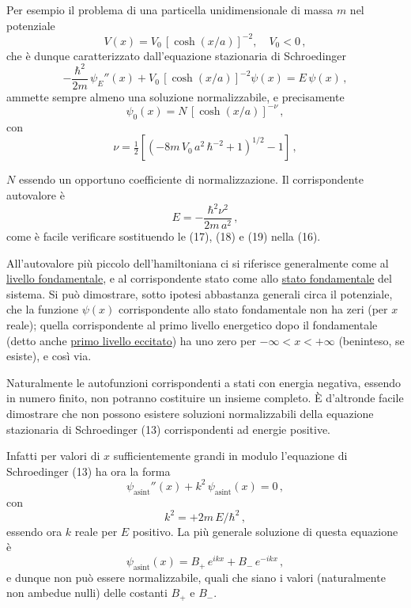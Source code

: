\documentclass[11pt, a4paper]{book}
\numberwithin{equation}{section}
\begin{document}
Per esempio il problema di una particella unidimensionale di massa
$m$ nel potenziale
\begin{equation}
V(x) = V_0\, \left[\cosh(x/a)\right]^{-2}, \quad V_0 < 0 \,, \tag{15}
\end{equation}
che è dunque caratterizzato dall'equazione stazionaria di Schroedinger
\begin{equation}
-\frac{\hbar^2}{2m}\, \psi_E''(x) + V_0\, \left[\cosh(x/a)\right]^{-2} \psi(x) = E\, \psi(x) \,, \tag{16}
\end{equation}
ammette sempre almeno una soluzione normalizzabile, e precisamente
\begin{equation}
\psi_0(x) = N\, \left[\cosh(x/a)\right]^{-\nu} \,, \tag{17}
\end{equation}
con
\begin{equation}
\nu = \tfrac{1}{2}\left[\left(-8m\, V_0\, a^2\, \hbar^{-2} + 1\right)^{1/2} - 1\right] \,, \tag{18}
\end{equation}


$N$ essendo un opportuno coefficiente di normalizzazione. Il corrispondente autovalore è
\begin{equation}
E = -\frac{\hbar^2 \nu^2}{2m\, a^2} \,, \tag{19}
\end{equation}
come è facile verificare sostituendo le (17), (18) e (19) nella (16).

All'autovalore più piccolo dell'hamiltoniana ci si riferisce generalmente come al \underline{livello fondamentale}, e al corrispondente stato come allo \underline{stato fondamentale} del sistema. Si può dimostrare, sotto ipotesi abbastanza generali circa il potenziale, che la funzione $\psi(x)$ corrispondente allo stato fondamentale non ha zeri (per $x$ reale); quella corrispondente al primo livello energetico dopo il fondamentale (detto anche \underline{primo livello eccitato}) ha uno zero per $-\infty < x < +\infty$ (beninteso, se esiste), e così via.

Naturalmente le autofunzioni corrispondenti a stati con energia negativa, essendo in numero finito, non potranno costituire un insieme completo. È d'altronde facile dimostrare che non possono esistere soluzioni normalizzabili della equazione stazionaria di Schroedinger (13) corrispondenti ad energie positive.

Infatti per valori di $x$ sufficientemente grandi in modulo l'equazione di Schroedinger (13) ha ora la forma
\[
\psi_{\text{asint}}''(x) + k^2\, \psi_{\text{asint}}(x) = 0 \,,
\]
con
\[
k^2 = +2m\, E / \hbar^2 \,,
\]
essendo ora $k$ reale per $E$ positivo. La più generale soluzione di questa equazione è
\[
\psi_{\text{asint}}(x) = B_+\, e^{ikx} + B_-\, e^{-ikx} \,,
\]
e dunque non può essere normalizzabile, quali che siano i valori (naturalmente non ambedue nulli) delle costanti $B_+$ e $B_-$.
\end{document}
